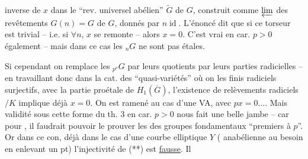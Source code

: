 inverse de $x$ dans le ``rev. universel abélien'' $\widetilde G$ de $G$, construit comme $\varprojlim$ des revêtements $G(n)=G$ de $G$, donnés par $n\operatorname{id}$. L'énoncé dit que si ce torseur est trivial -- i.e. si $\forall n$, $x$ se remonte -- alors $x=0$. C'est vrai en car. $p>0$ également -- mais dans ce cas les ${}_nG$ ne sont pas étales.


Si cependant on remplace les ${}_{p^\nu}G$ par leurs quotients par leurs parties radicielles -- en travaillant donc dans la cat. des ``quasi-variétés'' où on   les   finis radiciels surjectifs,   avec la partie proétale de $H_1(\overline G)$,  l'existence de relèvements radiciels $/K$ implique déjà $x=0$.  On est ramené au cas d'une VA, avec $px=0$.... Mais  validité sous cette forme du th. 3 en car. $p>0$  nous fait une belle jambe -- car pour , il faudrait pouvoir le prouver   les  des groupes fondamentaux ``premiers à $p$''. Or dans ce con, déjà dans le cas d'une courbe elliptique $Y$ (  anabélienne au besoin en enlevant un pt) l'injectivité de (**) est \uline{fausse}. Il

